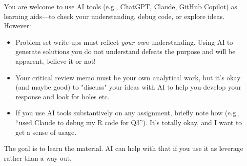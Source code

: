 \documentclass[PS]{syllabus}
\begin{document}
\begin{syllabus}
You are welcome to use AI tools (e.g., ChatGPT, Claude, GitHub Copilot) as learning aids---to check your understanding, debug code, or explore ideas. However:
\begin{itemize}
\item Problem set write-ups must reflect \textit{your own} understanding. Using AI to generate solutions you do not understand defeats the purpose and will be apparent, believe it or not!
\item Your critical review memo must be your own analytical work, but it's okay (and maybe good) to "discuss" your ideas with AI to help you develop your response and look for holes etc. 
\item If you use AI tools substantively on any assignment, briefly note how (e.g., ``used Claude to debug my R code for Q3''). It's totally okay, and I want to get a sense of usage.
\end{itemize}
The goal is to learn the material. AI can help with that if you use it as leverage rather than a way out.


\end{syllabus}
\end{document}
